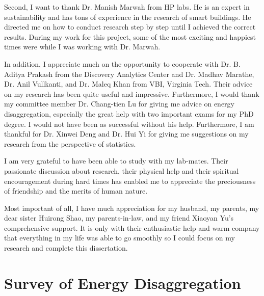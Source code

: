 \documentclass[12pt,pdf]{report}
\begin{document}
Second, I want to thank Dr. Manish Marwah from HP labs. 
He is an expert in sustainability and 
has tons of experience in the research of smart buildings.
He directed me on how to conduct research step by step until 
I achieved the correct results. During my work for this project, 
some of the most exciting and happiest times were while I was working with Dr. Marwah. 

In addition, I appreciate much on the opportunity to cooperate with 
Dr. B. Aditya Prakash from the Discovery Analytics Center and Dr. Madhav Marathe, 
Dr. Anil Vullkanti,  and Dr. Maleq Khan from VBI, Virginia Tech. 
Their advice on my research has been quite useful and 
impressive. Furthermore, I would thank my committee member Dr. Chang-tien Lu for 
giving me advice on energy disaggregation, 
especially the great help with two important exams for my PhD degree. 
I would not have been as successful without his help.  
Furthermore, I am thankful for Dr. Xinwei Deng and Dr. Hui Yi for giving me 
suggestions on my research from the perspective of statistics. 

I am very grateful to have been able to study with my lab-mates. 
Their passionate discussion about research, their physical help and their spiritual encouragement during hard times 
has enabled me to appreciate the preciousness of friendship and the merits of human nature. 

Most important of all, I have much appreciation for my husband, my parents, 
my dear sister Huirong Shao, 
my parents-in-law, and my friend Xiaoyan Yu's comprehensive support. 
It is only with their enthusiastic help and warm company that
everything in my life was able to go smoothly 
so I could focus on my research and complete this dissertation.

\pagebreak
\tableofcontents
\pagebreak

\listoffigures
\pagebreak

\listoftables
\pagebreak

\pagestyle{myheadings}


\chapter{Survey of Energy Disaggregation}











\end{document}
